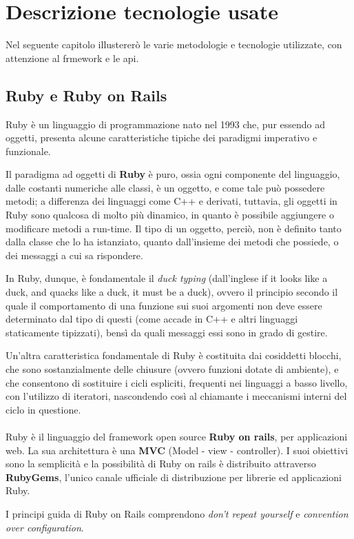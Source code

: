\chapter{Descrizione tecnologie usate}
	Nel seguente capitolo illustererò le varie metodologie e tecnologie utilizzate, con attenzione al frmework e le api.
	\section{Ruby e Ruby on Rails} 
	Ruby è un linguaggio di programmazione nato nel 1993 che, pur essendo ad oggetti, presenta alcune caratteristiche tipiche dei paradigmi imperativo e funzionale.
	
	Il paradigma ad oggetti di \textbf{Ruby} è puro, ossia ogni componente del linguaggio, dalle costanti numeriche alle classi, è un oggetto, e come tale può possedere metodi; a differenza dei linguaggi come C++ e derivati, tuttavia, gli oggetti in Ruby sono qualcosa di molto più dinamico, in quanto è possibile aggiungere o modificare metodi a run-time. Il tipo di un oggetto, perciò, non è definito tanto dalla classe che lo ha istanziato, quanto dall'insieme dei metodi che possiede, o dei messaggi a cui sa rispondere.
	
	In Ruby, dunque, è fondamentale il \textit{duck typing} (dall'inglese if it looks like a duck, and quacks like a duck, it must be a duck), ovvero il principio secondo il quale il comportamento di una funzione sui suoi argomenti non deve essere determinato dal tipo di questi (come accade in C++ e altri linguaggi staticamente tipizzati), bensì da quali messaggi essi sono in grado di gestire.
	
	Un'altra caratteristica fondamentale di Ruby è costituita dai cosiddetti blocchi, che sono sostanzialmente delle chiusure (ovvero funzioni dotate di ambiente), e che consentono di sostituire i cicli espliciti, frequenti nei linguaggi a basso livello, con l'utilizzo di iteratori, nascondendo così al chiamante i meccanismi interni del ciclo in questione.
	\\\\
	Ruby è il linguaggio del framework open source \textbf{Ruby on rails}, per applicazioni web. La sua architettura è una \textbf{MVC} (Model - view - controller). I suoi obiettivi sono la semplicità e la possibilità di 
	Ruby on rails è distribuito attraverso \textbf{RubyGems}, l'unico canale ufficiale di distribuzione per librerie ed applicazioni Ruby.
	
	I principi guida di Ruby on Rails comprendono \textit{don't repeat yourself} e \textit{convention over configuration}.
	
